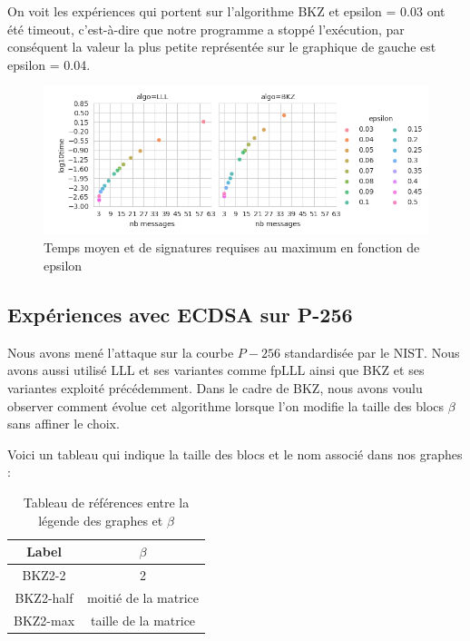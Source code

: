 \documentclass{backend}
\begin{document}
On voit les expériences qui portent sur l'algorithme BKZ et epsilon = 0.03 ont été timeout, c'est-à-dire que notre programme a stoppé l'exécution, par conséquent la valeur la plus petite représentée sur le graphique de gauche est epsilon = 0.04.

\begin{figure}[H]
    \centering
    \includegraphics[width=1\linewidth]{img/2048_320_meant_maxm_scatterplots_log.png}
    \caption{Temps moyen et de signatures requises au maximum en fonction de epsilon}
    \label{fig:2048_320_meant_maxm_scatterplots_log}
\end{figure}



\subsection{Expériences avec ECDSA sur P-256}

Nous avons mené l'attaque sur la courbe $P-256$ standardisée par le NIST. Nous avons aussi utilisé LLL et ses variantes comme fpLLL ainsi que BKZ et ses variantes exploité précédemment. Dans le cadre de BKZ, nous avons voulu observer comment évolue cet algorithme lorsque l'on modifie la taille des blocs $\beta$ sans affiner le choix.\smallbreak

Voici un tableau qui indique la taille des blocs et le nom associé dans nos graphes :

\begin{table}[H]
    \centering
    \caption{Tableau de références entre la légende des graphes et $\beta$}
    \begin{tabular}{|c|c|}
        \toprule
        Label & $\beta$\\
        \midrule
        BKZ2-2    & 2 \\
        BKZ2-half & moitié de la matrice\\
        BKZ2-max  & taille de la matrice \\
        \bottomrule
    \end{tabular}
    \label{tab:taille_blocs}
\end{table}
\end{document}
